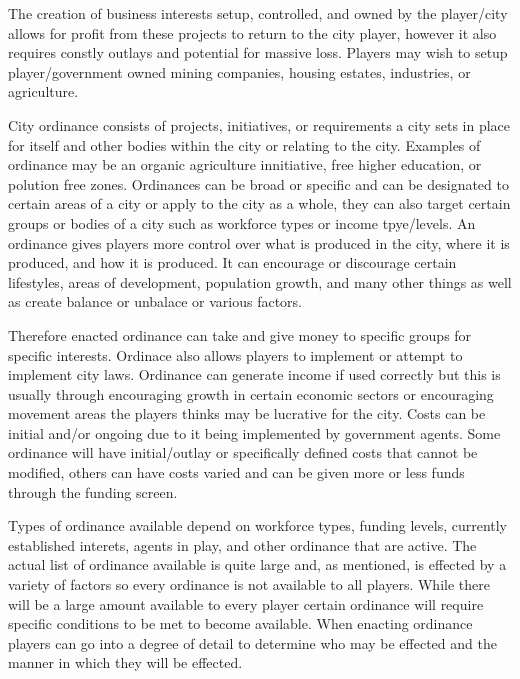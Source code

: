 The creation of business interests setup, controlled, and owned by the player/city allows for profit from these projects to return to the city player, however it also requires constly outlays and potential for massive loss. Players may wish to setup player/government owned mining companies, housing estates, industries, or agriculture. 




City ordinance consists of projects, initiatives, or requirements a city sets in place for itself and other bodies within the city or relating to the city. Examples of ordinance may be an organic agriculture innitiative, free higher education, or polution free zones. Ordinances can be broad or specific and can be designated to certain areas of a city or apply to the city as a whole, they can also target certain groups or bodies of a city such as workforce types or income tpye/levels. An ordinance gives players more control over what is produced in the city, where it is produced, and how it is produced. It can encourage or discourage certain lifestyles, areas of development, population growth, and many other things as well as create balance or unbalace or various factors.

Therefore enacted ordinance can take and give money to specific groups for specific interests. Ordinace also allows players to implement or attempt to implement city laws. Ordinance can generate income if used correctly but this is usually through encouraging growth in certain economic sectors or encouraging movement areas the players thinks may be lucrative for the city. Costs can be initial and/or ongoing due to it being implemented by government agents. Some ordinance will have initial/outlay or specifically defined costs that cannot be modified, others can have costs varied and can be given more or less funds through the funding screen. 


Types of ordinance available depend on workforce types, funding levels, currently established interets, agents in play, and other ordinance that are active. The actual list of ordinance available is quite large and, as mentioned, is effected by a variety of factors so every ordinance is not available to all players. While there will be a large amount available to every player certain ordinance will require specific conditions to be met to become available. When enacting ordinance players can go into a degree of detail to determine who may be effected and the manner in which they will be effected. 




